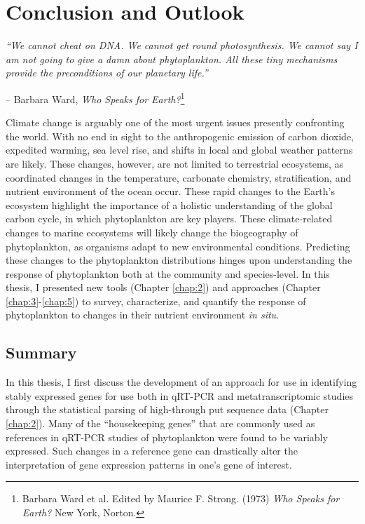 \chapter{Conclusion and Outlook}
\label{chap:6}
\clearpage
\raggedbottom

\textit{``We cannot cheat on DNA. We cannot get round photosynthesis. We cannot say I am not going to give a damn about phytoplankton. All these tiny mechanisms provide the preconditions of our planetary life.'' }
\begin{flushright}-- Barbara Ward, \textit{Who Speaks for Earth?}\footnote{Barbara Ward et al. Edited by Maurice F. Strong. (1973) \textit{Who Speaks for Earth?} New York, Norton. }\end{flushright}
    Climate change is arguably one of the most urgent issues presently confronting the world. With no end in sight to the anthropogenic emission of carbon dioxide, expedited warming, sea level rise, and shifts in local and global weather patterns are likely. These changes, however, are not limited to terrestrial ecosystems, as coordinated changes in the temperature, carbonate chemistry, stratification, and nutrient environment of the ocean occur. These rapid changes to the Earth's ecosystem highlight the importance of a holistic understanding of the global carbon cycle, in which phytoplankton are key players. These climate-related changes to marine ecosystems will likely change the biogeography of phytoplankton, as organisms adapt to new environmental conditions. Predicting these changes to the phytoplankton distributions hinges upon understanding the response of phytoplankton both at the community and species-level. In this thesis, I presented new tools (Chapter \ref{chap:2}) and approaches (Chapter \ref{chap:3}-\ref{chap:5}) to survey, characterize, and quantify the response of phytoplankton to changes in their nutrient environment \textit{in situ}. 

\par
\section{Summary}
In this thesis, I first discuss the development of an approach for use in identifying stably expressed genes for use both in qRT-PCR and metatranscriptomic studies through the statistical parsing of high-through put sequence data (Chapter \ref{chap:2}). Many of the ``housekeeping genes'' that are commonly used as references in qRT-PCR studies of phytoplankton were found to be variably expressed. Such changes in a reference gene can drastically alter the interpretation of gene expression patterns in one's gene of interest. %



